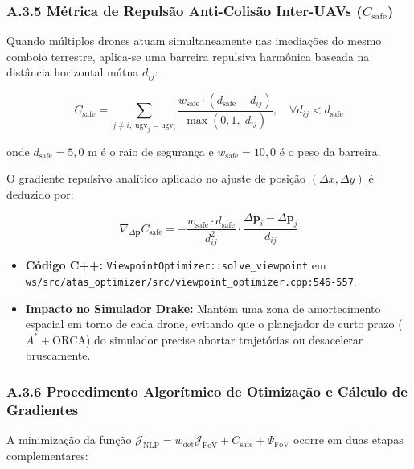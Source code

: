 \documentclass[
  brazilian,
  a4paper]{article}
\providecommand{\tightlist}{%
  \setlength{\itemsep}{0pt}\setlength{\parskip}{0pt}}
\begin{document}
\subsubsection{\texorpdfstring{A.3.5 Métrica de Repulsão Anti-Colisão
Inter-UAVs
(\(C_{\text{safe}}\))}{A.3.5 Métrica de Repulsão Anti-Colisão Inter-UAVs (C\_\{\textbackslash text\{safe\}\})}}\label{a.3.5-muxe9trica-de-repulsuxe3o-anti-colisuxe3o-inter-uavs-c_textsafe}

Quando múltiplos drones atuam simultaneamente nas imediações do mesmo
comboio terrestre, aplica-se uma barreira repulsiva harmônica baseada na
distância horizontal mútua \(d_{ij}\):

\[C_{\text{safe}} = \sum_{j \ne i, \; \text{ugv}_j = \text{ugv}_i} \frac{w_{\text{safe}} \cdot (d_{\text{safe}} - d_{ij})}{\max(0{,}1, \; d_{ij})}, \quad \forall d_{ij} < d_{\text{safe}}\]

onde \(d_{\text{safe}} = 5{,}0\text{ m}\) é o raio de segurança e
\(w_{\text{safe}} = 10{,}0\) é o peso da barreira.

O gradiente repulsivo analítico aplicado no ajuste de posição
\((\Delta x, \Delta y)\) é deduzido por:

\[\nabla_{\Delta \mathbf{p}} C_{\text{safe}} = - \frac{w_{\text{safe}} \cdot d_{\text{safe}}}{d_{ij}^2} \cdot \frac{\Delta \mathbf{p}_i - \Delta \mathbf{p}_j}{d_{ij}}\]

\begin{itemize}
\tightlist
\item
  \textbf{Código C++:} \texttt{ViewpointOptimizer:\allowbreak{}:\allowbreak{}solve\_\allowbreak{}viewpoint} em
  \texttt{ws/\allowbreak{}src/\allowbreak{}atas\_\allowbreak{}optimizer/\allowbreak{}src/\allowbreak{}viewpoint\_\allowbreak{}optimizer.\allowbreak{}cpp:\allowbreak{}546-557}.
\item
  \textbf{Impacto no Simulador Drake:} Mantém uma zona de amortecimento
  espacial em torno de cada drone, evitando que o planejador de curto
  prazo (\(A^* + \text{ORCA}\)) do simulador precise abortar trajetórias
  ou desacelerar bruscamente.
\end{itemize}

\subsubsection{A.3.6 Procedimento Algorítmico de Otimização e Cálculo de
Gradientes}\label{a.3.6-procedimento-algoruxedtmico-de-otimizauxe7uxe3o-e-cuxe1lculo-de-gradientes}

A minimização da função
\(\mathcal{J}_{\text{NLP}} = w_{\text{det}} \mathcal{J}_{\text{FoV}} + C_{\text{safe}} + \Psi_{\text{FoV}}\)
ocorre em duas etapas complementares:
\end{document}
